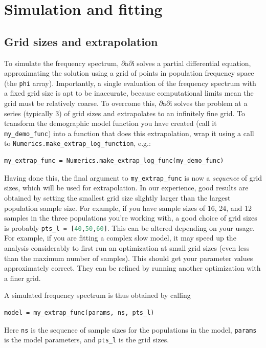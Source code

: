 \documentclass[12pt]{article}
\makeatletter
\newcommand{\dadi}{$\partial$a$\partial$i\xspace}
\newcommand{\py}[1]{\lstinline[language=Python, showstringspaces=False]@#1@}
\makeatother
\begin{document}
\clearpage

\section{Simulation and fitting}

\subsection{Grid sizes and extrapolation}

To simulate the frequency spectrum, \dadi solves a partial differential equation, approximating the solution using a grid of points in population frequency space (the \py{phi} array).
Importantly, a single evaluation of the frequency spectrum with a fixed grid size is apt to be inaccurate, because computational limits mean the grid must be relatively coarse.
To overcome this, \dadi solves the problem at a series (typically 3) of grid sizes and extrapolates to an infinitely fine grid.
To transform the demographic model function you have created (call it \py{my_demo_func}) into a function that does this extrapolation, wrap it using a call to \py{Numerics.make_extrap_log_function}, e.g.:
\begin{lstlisting}
my_extrap_func = Numerics.make_extrap_log_func(my_demo_func)
\end{lstlisting}
Having done this, the final argument to \py{my_extrap_func} is now a \emph{sequence} of grid sizes, which will be used for extrapolation.
In our experience, good results are obtained by setting the smallest grid size slightly larger than the largest population sample size.
For example, if you have sample sizes of 16, 24, and 12 samples in the three populations you're working with, a good choice of grid sizes is probably \py{pts_l = [40,50,60]}.
This can be altered depending on your usage. For example, if you are fitting a complex slow model, it may speed up the analysis considerably to first run an optimization at small grid sizes (even less than the maximum number of samples).
This should get your parameter values approximately correct.
They can be refined by running another optimization with a finer grid.

A simulated frequency spectrum is thus obtained by calling
\begin{lstlisting}
model = my_extrap_func(params, ns, pts_l)
\end{lstlisting}
Here \py{ns} is the sequence of sample sizes for the populations in the model, \py{params} is the model parameters, and \py{pts_l} is the grid sizes.
\end{document}
